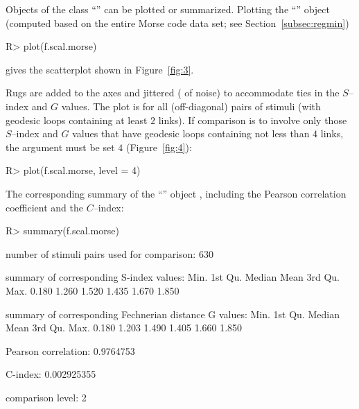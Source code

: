 \documentclass[nojss]{jss}
\begin{document}
Objects of the class ``'' can be plotted or summarized. Plotting the ``'' object 
(computed based on the entire Morse code data set; see Section~\ref{subsec:regmin})
\begin{CodeChunk}
\begin{CodeInput}
R> plot(f.scal.morse)
\end{CodeInput}
\end{CodeChunk}
gives the scatterplot shown in Figure~\ref{fig:3}. 

Rugs are added to the axes and jittered ( of noise) to accommodate ties in the $S$--index and $G$ values.
The plot is for all (off-diagonal) pairs of stimuli (with geodesic loops containing at least $2$ links). If comparison is to involve 
only those $S$--index and $G$ values that have geodesic loops containing not less than $4$ links, the argument  must be set
$4$ (Figure~\ref{fig:4}):
\begin{CodeChunk}
\begin{CodeInput}
R> plot(f.scal.morse, level = 4)
\end{CodeInput}
\end{CodeChunk}

The corresponding summary of the ``'' object , 
including the Pearson correlation coefficient and the $C$--index:
\begin{CodeChunk}
\begin{CodeInput}
R> summary(f.scal.morse)
\end{CodeInput}
\begin{CodeOutput}
number of stimuli pairs used for comparison: 630 

summary of corresponding S-index values:
   Min. 1st Qu.  Median    Mean 3rd Qu.    Max. 
  0.180   1.260   1.520   1.435   1.670   1.850 

summary of corresponding Fechnerian distance G values:
   Min. 1st Qu.  Median    Mean 3rd Qu.    Max. 
  0.180   1.203   1.490   1.405   1.660   1.850 

Pearson correlation: 0.9764753 

C-index: 0.002925355 

comparison level: 2
\end{CodeOutput}
\end{CodeChunk}
\end{document}
